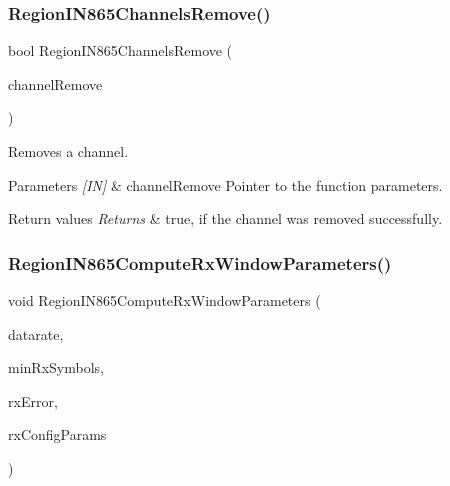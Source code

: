 \subsubsection{\texorpdfstring{Region\+I\+N865\+Channels\+Remove()}{RegionIN865ChannelsRemove()}}
{\footnotesize\ttfamily bool Region\+I\+N865\+Channels\+Remove (\begin{DoxyParamCaption}\item[{\hyperlink{group__REGION_gaa37468560d2fc81a977b57a48e5d72c0}{Channel\+Remove\+Params\+\_\+t} $\ast$}]{channel\+Remove }\end{DoxyParamCaption})}



Removes a channel. 


\begin{DoxyParams}{Parameters}
{\em \mbox{[}\+I\+N\mbox{]}} & channel\+Remove Pointer to the function parameters.\\
\hline
\end{DoxyParams}

\begin{DoxyRetVals}{Return values}
{\em Returns} & true, if the channel was removed successfully. \\
\hline
\end{DoxyRetVals}
\mbox{\label{group__REGIONIN865_ga66be427601e7105b522c36160c8513a7}} 
\subsubsection{\texorpdfstring{Region\+I\+N865\+Compute\+Rx\+Window\+Parameters()}{RegionIN865ComputeRxWindowParameters()}}
{\footnotesize\ttfamily void Region\+I\+N865\+Compute\+Rx\+Window\+Parameters (\begin{DoxyParamCaption}\item[{int8\+\_\+t}]{datarate,  }\item[{uint8\+\_\+t}]{min\+Rx\+Symbols,  }\item[{uint32\+\_\+t}]{rx\+Error,  }\item[{\hyperlink{group__REGION_ga375c038078dfcfc7ef14280021db719e}{Rx\+Config\+Params\+\_\+t} $\ast$}]{rx\+Config\+Params }\end{DoxyParamCaption})}

